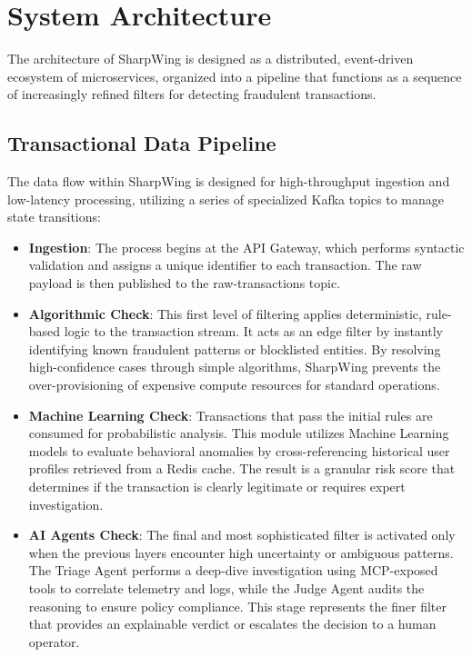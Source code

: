 \documentclass[12pt]{report}
\begin{document}
\chapter{System Architecture}
\label{ch:system_architecture}

The architecture of SharpWing is designed as a distributed, event-driven ecosystem of microservices, organized into a pipeline that functions as a sequence of increasingly refined filters for detecting fraudulent transactions.

\section{Transactional Data Pipeline}
The data flow within SharpWing is designed for high-throughput ingestion and low-latency processing, utilizing a series of specialized Kafka topics to manage state transitions:

\begin{itemize}
    \item \textbf{Ingestion}: The process begins at the API Gateway, which performs syntactic validation and assigns a unique identifier to each transaction. The raw payload is then published to the raw-transactions topic.
    
    \item \textbf{Algorithmic Check}: This first level of filtering applies deterministic, rule-based logic to the transaction stream. It acts as an edge filter by instantly identifying known fraudulent patterns or blocklisted entities. By resolving high-confidence cases through simple algorithms, SharpWing prevents the over-provisioning of expensive compute resources for standard operations.

    \item \textbf{Machine Learning Check}: Transactions that pass the initial rules are consumed for probabilistic analysis. This module utilizes Machine Learning models to evaluate behavioral anomalies by cross-referencing historical user profiles retrieved from a Redis cache. The result is a granular risk score that determines if the transaction is clearly legitimate or requires expert investigation.

    \item \textbf{AI Agents Check}: The final and most sophisticated filter is activated only when the previous layers encounter high uncertainty or ambiguous patterns. The Triage Agent performs a deep-dive investigation using MCP-exposed tools to correlate telemetry and logs, while the Judge Agent audits the reasoning to ensure policy compliance. This stage represents the finer filter that provides an explainable verdict or escalates the decision to a human operator.
\end{itemize}
\end{document}
